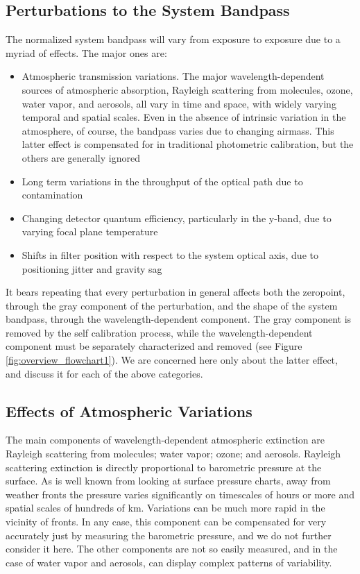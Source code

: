 \documentclass[12pt,preprint]{aastex}
\begin{document}
\subsection{Perturbations to the System Bandpass}
The normalized system bandpass will vary from exposure to exposure due to a myriad of effects.  The major ones are:
\begin{itemize}
\item{Atmospheric transmission variations.  The major wavelength-dependent sources of atmospheric absorption, Rayleigh scattering from molecules, ozone, water vapor, and aerosols, all vary in time and space, with widely varying temporal and spatial scales.  Even in the absence of intrinsic variation in the atmosphere, of course, the bandpass varies due to changing airmass.  This latter effect is compensated for in traditional photometric calibration, but the others are generally ignored}
\item{Long term variations in the throughput of the optical path due to contamination}
\item{Changing detector quantum efficiency, particularly in the y-band, due to varying focal plane temperature}
\item{Shifts in filter position with respect to the system optical axis, due to positioning jitter and gravity sag}
\end{itemize}

It bears repeating that every perturbation in general affects both the zeropoint, through the gray component of the perturbation, and the shape of the system bandpass, through the wavelength-dependent component.  The gray component is removed by the self calibration process, while the wavelength-dependent component must be separately characterized and removed (see Figure \ref{fig:overview_flowchart1}).  We are concerned here only about the latter effect, and discuss it for each of the above categories.

\subsection{Effects of Atmospheric Variations}

The main components of wavelength-dependent atmospheric extinction are Rayleigh scattering from molecules; water vapor; ozone; and aerosols.   Rayleigh scattering extinction is directly proportional to barometric pressure at the surface.  As is well known from looking at surface pressure charts, away from weather fronts the pressure varies significantly on timescales of hours or more and spatial scales of hundreds of km.  Variations can be much more rapid in the vicinity of fronts.   In any case, this component can be compensated for very accurately just by measuring the barometric pressure, and we do not further consider it here.  The other components are not so easily measured, and in the case of water vapor and aerosols, can display complex patterns of variability.  
\end{document}
